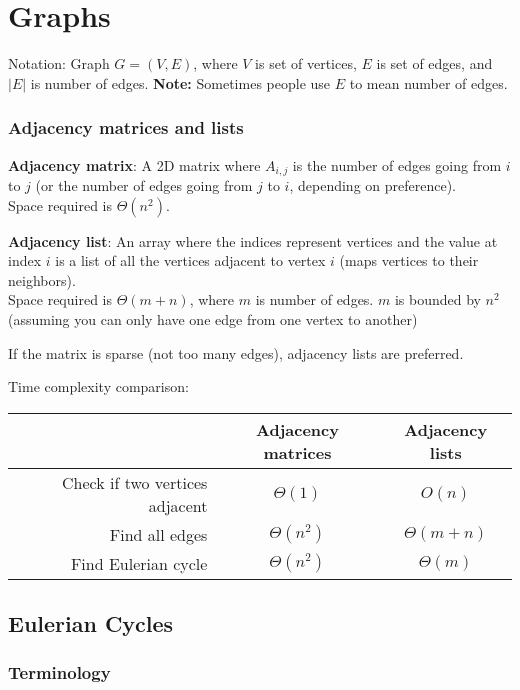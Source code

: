 \section{Graphs}

Notation: Graph $G = (V, E)$, where $V$ is set of vertices, $E$ is set of edges, and $|E|$ is number of edges. \textbf{Note:} Sometimes people use $E$ to mean number of edges.

\subsubsection*{Adjacency matrices and lists}

\textbf{Adjacency matrix}: A 2D matrix where $A_{i,j}$ is the number of edges going from $i$ to $j$ (or the number of edges going from $j$ to $i$, depending on preference).\\
Space required is $\Theta(n^2)$.

\textbf{Adjacency list}: An array where the indices represent vertices and the value at index $i$ is a list of all the vertices adjacent to vertex $i$ (maps vertices to their neighbors).\\
Space required is $\Theta(m + n)$, where $m$ is number of edges. $m$ is bounded by $n^2$ (assuming you can only have one edge from one vertex to another)

If the matrix is sparse (not too many edges), adjacency lists are preferred.

Time complexity comparison:\\
\begin{tabular}{|r|c|c|}
     \hline
     & Adjacency matrices & Adjacency lists \\
     \hline
     Check if two vertices adjacent & $\Theta(1)$ & $O(n)$ \\
     \hline
     Find all edges & $\Theta(n^2)$ & $\Theta(m + n)$ \\
     \hline
     Find Eulerian cycle & $\Theta(n^2)$ & $\Theta(m)$ \\
     \hline
\end{tabular}

\subsection{Eulerian Cycles}

\subsubsection*{Terminology}

